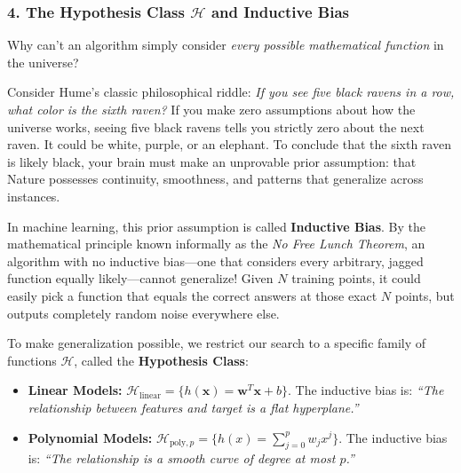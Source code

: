 \subsubsection{4. The Hypothesis Class $\mathcal{H}$ and Inductive Bias}
Why can't an algorithm simply consider \emph{every possible mathematical function} in the universe?

Consider Hume's classic philosophical riddle: \emph{If you see five black ravens in a row, what color is the sixth raven?} If you make zero assumptions about how the universe works, seeing five black ravens tells you strictly zero about the next raven. It could be white, purple, or an elephant. To conclude that the sixth raven is likely black, your brain must make an unprovable prior assumption: that Nature possesses continuity, smoothness, and patterns that generalize across instances.

In machine learning, this prior assumption is called \textbf{Inductive Bias}. By the mathematical principle known informally as the \emph{No Free Lunch Theorem}, an algorithm with no inductive bias—one that considers every arbitrary, jagged function equally likely—cannot generalize! Given $N$ training points, it could easily pick a function that equals the correct answers at those exact $N$ points, but outputs completely random noise everywhere else.

To make generalization possible, we restrict our search to a specific family of functions $\mathcal{H}$, called the \textbf{Hypothesis Class}:
\begin{itemize}
    \item \textbf{Linear Models:} $\mathcal{H}_{\text{linear}} = \{ h(\mathbf{x}) = \mathbf{w}^T \mathbf{x} + b \}$. The inductive bias is: \emph{``The relationship between features and target is a flat hyperplane.''}
    \item \textbf{Polynomial Models:} $\mathcal{H}_{\text{poly}, p} = \{ h(x) = \sum_{j=0}^p w_j x^j \}$. The inductive bias is: \emph{``The relationship is a smooth curve of degree at most $p$.''}
\end{itemize}

